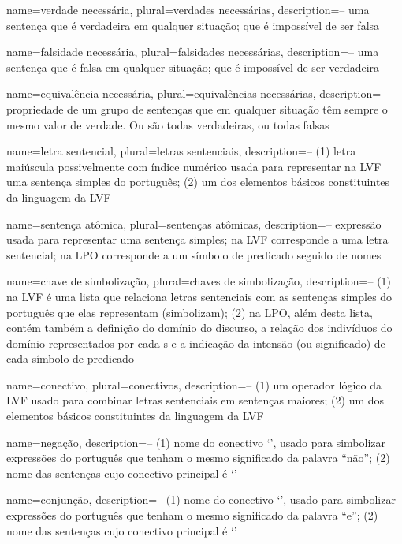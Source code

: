 {
 name={verdade necessária},
 plural={verdades necessárias},
 description={-- uma sentença que é verdadeira em qualquer situação; que é impossível de ser falsa}
}

{
 name={falsidade necessária},
 plural={falsidades necessárias},
 description={-- uma sentença que é falsa em qualquer situação; que é impossível de ser verdadeira}
}

{
 name={equivalência necessária},
 plural={equivalências necessárias},
 description={-- propriedade de um grupo de sentenças que em qualquer situação têm sempre o mesmo valor de verdade. Ou são todas verdadeiras, ou todas falsas}
}

{
 name=letra sentencial,
 plural=letras sentenciais,
 description={-- (1) letra maiúscula possivelmente com índice numérico usada para representar na LVF uma sentença simples do português; (2) um dos elementos básicos constituintes da linguagem da LVF}
}

{
 name=sentença atômica,
 plural=sentenças atômicas,
 description={-- expressão usada para representar uma sentença simples; na LVF corresponde a uma letra sentencial; na LPO corresponde a um símbolo de predicado seguido de nomes}
}

{
 name=chave de simbolização,
 plural=chaves de simbolização,
 description={-- (1) na LVF é uma lista que relaciona letras sentenciais com as sentenças simples do português que elas representam (simbolizam); (2) na LPO, além desta lista, contém também a definição do domínio do discurso, a relação dos indivíduos do domínio representados por cada s e a indicação da intensão (ou significado) de cada símbolo de predicado}
}

{
 name=conectivo,
 plural=conectivos,
description={-- (1) um operador lógico da LVF usado para combinar letras sentenciais em sentenças maiores; (2) um dos elementos básicos constituintes da linguagem da LVF}
}

{
 name=negação,
 description={-- (1) nome do conectivo `\enot', usado para simbolizar expressões do português que tenham o mesmo significado da palavra ``não''; (2) nome das sentenças cujo conectivo principal é `\enot'}
}

{
 name=conjunção,
 description={-- (1) nome do conectivo `\eand', usado para simbolizar expressões do português que tenham o mesmo significado da palavra ``e''; (2) nome das sentenças cujo conectivo principal é `\eand'}
}

